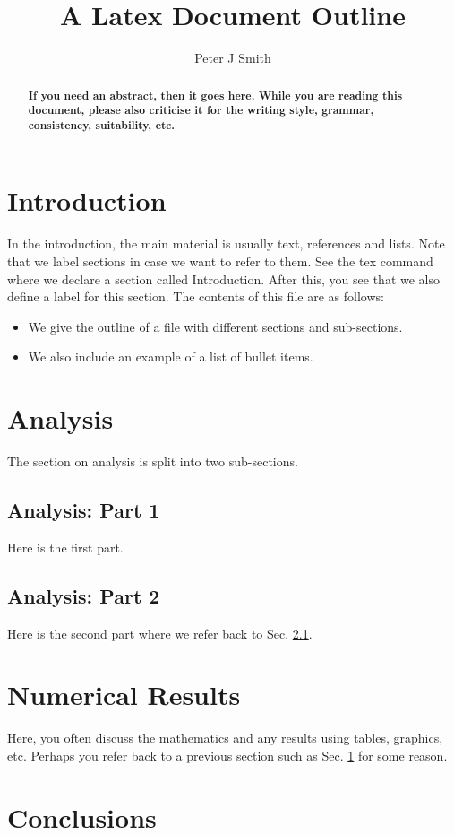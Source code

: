 \documentclass{article}
\begin{document}
\title{A Latex Document Outline}

\author{Peter J Smith}

\maketitle

\begin{abstract}
\textbf{If you need an abstract, then it goes here. While you are reading this document, please also criticise it for the writing style, grammar, consistency, suitability, etc. }
\end{abstract}

\section{Introduction}\label{intro}
In the introduction, the main material is usually text, references and lists. Note that we label sections in case we want to refer to them. See the tex command where we declare a section called Introduction. After this, you see that we also define a label for this section. The contents of this file are as follows: 
\begin{itemize}
\item We give the outline of a file with different sections and sub-sections. 
\item We also include an example of a list of bullet items.
\end{itemize}

\section{Analysis}\label{analysis}
The section on analysis is split into two sub-sections. 

\subsection{Analysis: Part 1}\label{analysis1}
Here is the first part.

\subsection{Analysis: Part 2}\label{analysis2}
Here is the second part where we refer back to Sec. \ref{analysis1}.

\section{Numerical Results}\label{NumRes}
 Here, you often discuss the mathematics and any results using tables, graphics, etc. Perhaps you refer back to a previous section such as Sec. \ref{intro} for some reason.
 
 \section{Conclusions}\label{Conc}
\end{document}
